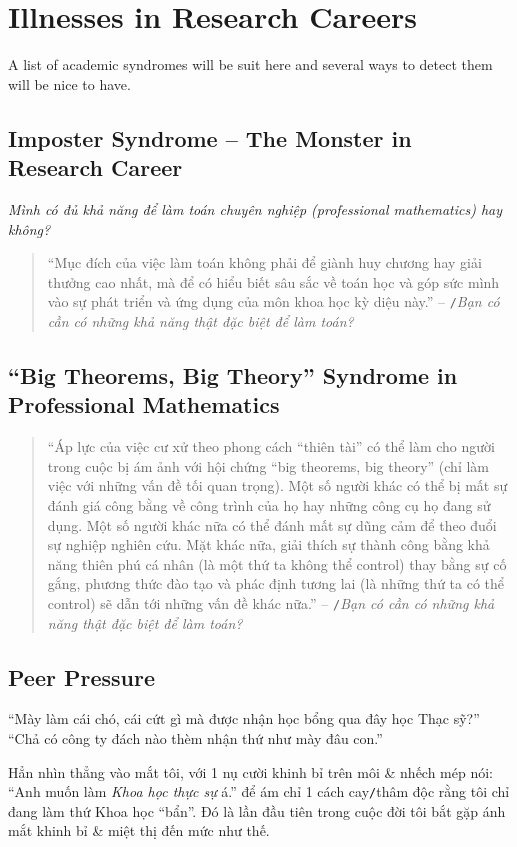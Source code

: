\documentclass{article}
\numberwithin{equation}{section}
\begin{document}
\section{Illnesses in Research Careers}
A list of academic syndromes will be suit here and several ways to detect them will be nice to have.

\subsection{Imposter Syndrome -- The Monster in Research Career}
\textit{Mình có đủ khả năng để làm toán chuyên nghiệp (professional mathematics) hay không?}
\begin{quotation}
	``Mục đích của việc làm toán không phải để giành huy chương hay giải thưởng cao nhất, mà để có hiểu biết sâu sắc về toán học và góp sức mình vào sự phát triển và ứng dụng của môn khoa học kỳ diệu này.'' -- \cite{VHV's blog}\texttt{/}\textit{Bạn có cần có những khả năng thật đặc biệt để làm toán?}
\end{quotation}

\subsection{``Big Theorems, Big Theory'' Syndrome in Professional Mathematics}
\begin{quotation}
	``Áp lực của việc cư xử theo phong cách ``thiên tài'' có thể làm cho người trong cuộc bị ám ảnh với hội chứng ``big theorems, big theory'' (chỉ làm việc với những vấn đề tối quan trọng). Một số người khác có thể bị mất sự đánh giá công bằng về công trình của họ hay những công cụ họ đang sử dụng. Một số người khác nữa có thể đánh mất sự dũng cảm để theo đuổi sự nghiệp nghiên cứu. Mặt khác nữa, giải thích sự thành công bằng khả năng thiên phú cá nhân (là một thứ ta không thể control) thay bằng sự cố gắng, phương thức đào tạo và phác định tương lai (là những thứ ta có thể control) sẽ dẫn tới những vấn đề khác nữa.'' -- \cite{VHV's blog}\texttt{/}\textit{Bạn có cần có những khả năng thật đặc biệt để làm toán?}
\end{quotation}

\subsection{Peer Pressure}
``Mày làm cái chó, cái cứt gì mà được nhận học bổng qua đây học Thạc sỹ?'' ``Chả có công ty đách nào thèm nhận thứ như mày đâu con.''

Hẳn nhìn thẳng vào mắt tôi, với 1 nụ cười khinh bỉ trên môi \& nhếch mép nói: ``Anh muốn làm \textit{Khoa học thực sự} á.'' để ám chỉ 1 cách cay\texttt{/}thâm độc rằng tôi chỉ đang làm thứ Khoa học ``bẩn''. Đó là lần đầu tiên trong cuộc đời tôi bắt gặp ánh mắt khinh bỉ \& miệt thị đến mức như thế.
\end{document}

